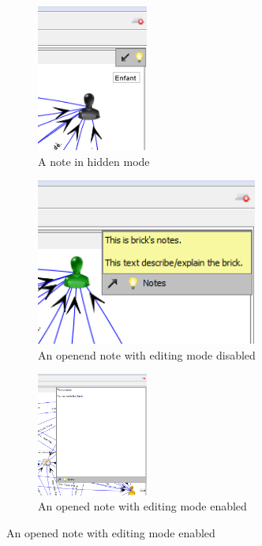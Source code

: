 \begin{figure}[h!]
\centering
\begin{subfigure}{0.4\textwidth}

\centering
\includegraphics[width=0.4\textwidth]{../images/note_fermee.png}
\caption{A note in hidden mode}
\end{subfigure}

\begin{subfigure}{0.4\textwidth}

\centering
\includegraphics[width=0.8\textwidth]{../images/note_ouverte_pas_edition.png}
\caption{An openend note with editing mode disabled}
\end{subfigure}

\begin{subfigure}{\textwidth}

\centering
\includegraphics[width=0.4\textwidth]{../images/note_ouverte_edition.png}
\caption{An opened note with editing mode enabled}
\end{subfigure}


\end{figure}



